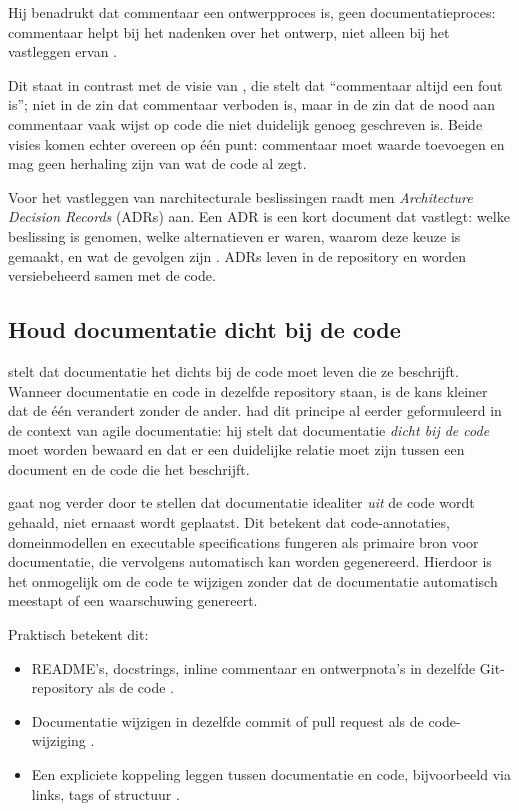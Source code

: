Hij benadrukt dat commentaar een ontwerpproces is, geen documentatieproces: commentaar helpt bij het nadenken over het ontwerp, niet alleen bij het vastleggen ervan \autocite{ousterhout2018philosophy}.

Dit staat in contrast met de visie van \textcite{martin2008clean}, die stelt dat ``commentaar altijd een fout is''; niet in de zin dat commentaar verboden is, maar in de zin dat de nood aan commentaar vaak wijst op code die niet duidelijk genoeg geschreven is.
Beide visies komen echter overeen op \'e\'en punt: commentaar moet waarde toevoegen en mag geen herhaling zijn van wat de code al zegt.

Voor het vastleggen van narchitecturale beslissingen raadt men \textit{Architecture Decision Records} (ADRs) aan. Een ADR is een kort document dat vastlegt: welke beslissing is genomen, welke alternatieven er waren, waarom deze keuze is gemaakt, en wat de gevolgen zijn \autocite{martraire2019livingdocumentation}. ADRs leven in de repository en worden versiebeheerd samen met de code.

\subsection{Houd documentatie dicht bij de code}
\textcite{gentle2017docslikecode} stelt dat documentatie het dichts bij de code moet leven die ze beschrijft.
Wanneer documentatie en code in dezelfde repository staan, is de kans kleiner dat de \'e\'en verandert zonder de ander.
\textcite{ruping2005agiledocumentation} had dit principe al eerder geformuleerd in de context van agile documentatie: hij stelt dat documentatie \textit{dicht bij de code} moet worden bewaard en dat er een duidelijke relatie moet zijn tussen een document en de code die het beschrijft.

\textcite{martraire2019livingdocumentation} gaat nog verder door te stellen dat documentatie idealiter \textit{uit} de code wordt gehaald, niet ernaast wordt geplaatst. Dit betekent dat code-annotaties, domeinmodellen en executable specifications fungeren als primaire bron voor documentatie, die vervolgens automatisch kan worden gegenereerd. Hierdoor is het onmogelijk om de code te wijzigen zonder dat de documentatie automatisch meestapt of een waarschuwing genereert.

Praktisch betekent dit:
\begin{itemize}
    \item README's, docstrings, inline commentaar en ontwerpnota's in dezelfde Git-repository als de code \autocite{gentle2017docslikecode}.
    \item Documentatie wijzigen in dezelfde commit of pull request als de code-wijziging \autocite{etter2016moderntechwriting}.
    \item Een expliciete koppeling leggen tussen documentatie en code, bijvoorbeeld via links, tags of structuur \autocite{bhatti2021docsdevelopers}.
\end{itemize}

